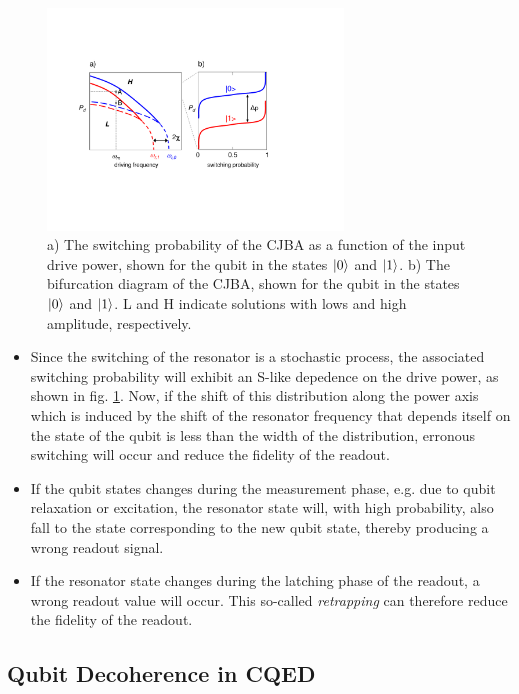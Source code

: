 \begin{figure}
	\includegraphics[width=0.7\textwidth]{./material/figures/2-qubit-processor/readout_principle}
	\caption[]{a) The switching probability of the CJBA as a function of the input drive power, shown for the qubit in the states $\left| 0 \right>$ and $\left| 1 \right>$. b) The bifurcation diagram of the CJBA, shown for the qubit in the states $\left| 0 \right>$ and $\left| 1 \right>$. L and H indicate solutions with lows and high amplitude, respectively.}
	\label{fig:readout_process_illustration}
\end{figure}

\begin{itemize}
\item Since the switching of the resonator is a stochastic process, the associated switching probability will exhibit an S-like depedence on the drive power, as shown in fig. \ref{fig:readout_process_illustration}. Now, if the shift of this distribution along the power axis which is induced by the shift of the resonator frequency that depends itself on the state of the qubit is less than the width of the distribution, erronous switching will occur and reduce the fidelity of the readout.
\item If the qubit states changes during the measurement phase, e.g. due to qubit relaxation or excitation, the resonator state will, with high probability, also fall to the state corresponding to the new qubit state, thereby producing a wrong readout signal.
\item If the resonator state changes during the latching phase of the readout, a wrong readout value will occur. This so-called {\it retrapping} can therefore reduce the fidelity of the readout.
\end{itemize}

\subsection{Qubit Decoherence in CQED}

